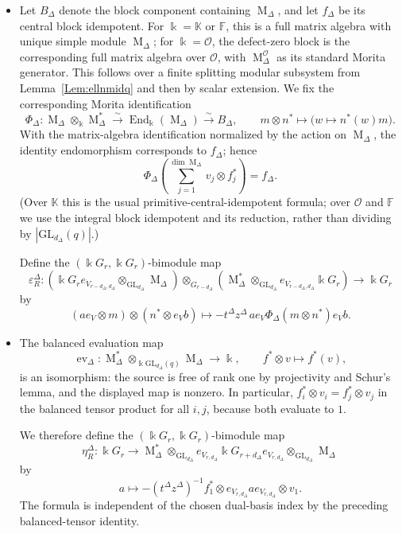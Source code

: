\documentclass[12pt]{amsart}
\numberwithin{itemcounter}{subsection}
\theoremstyle{plain}
\theoremstyle{definition}
\theoremstyle{remark}
\numberwithin{equation}{section}
\def\bbF{\mathbb{F}}
\def\bbK{\mathbb{K}}
\def\k{\Bbbk}
\def\calO{\mathcal{O}}
\def\GL{\mathrm{GL}}
\def\M{{\operatorname{M}\nolimits}}
\def\End{\operatorname{End}\nolimits}
\def\End{{\operatorname{End}}}
\begin{document}
\begin{itemize}
\item[$(c)$]
Let $B_\Delta$ denote the block component containing $\M_\Delta$, and let
$f_\Delta$ be its central block idempotent.  For $\k=\mathbb K$ or
$\mathbb F$, this is a full matrix algebra with unique simple module
$\M_\Delta$; for $\k=\mathcal O$, the defect-zero block is the corresponding
full matrix algebra over $\mathcal O$, with $\M_\Delta^{\mathcal O}$ as its
standard Morita generator.  This follows over a finite splitting modular
subsystem from Lemma~\ref{Lem:ellnmidq} and then by scalar extension.  We fix the corresponding Morita identification
\[
\Phi_\Delta:\M_\Delta\otimes_\k\M_\Delta^*
   \xrightarrow{\sim}\End_\k(\M_\Delta)
   \xrightarrow{\sim}B_\Delta,
\qquad
m\otimes n^*\longmapsto\bigl(w\mapsto n^*(w)m\bigr).
\]
With the matrix-algebra identification normalized by the action on
$\M_\Delta$, the identity endomorphism corresponds to $f_\Delta$; hence
\[
\Phi_\Delta\left(\sum_{j=1}^{\dim \M_\Delta}v_j\otimes f_j^*\right)=f_\Delta.
\]
(Over $\bbK$ this is the usual primitive-central-idempotent formula; over
$\calO$ and $\bbF$ we use the integral block idempotent and its reduction,
rather than dividing by $|\GL_{d_\Delta}(q)|$.)

Define the $(\k G_r,\k G_r)$-bimodule map
\[
\varepsilon^\Delta_R:
(\k G_r e_{V_{r-d_\Delta,d_\Delta}}\otimes_{\GL_{d_\Delta}}\M_\Delta)
\otimes_{G_{r-d_\Delta}}
(\M_\Delta^*\otimes_{\GL_{d_\Delta}}
 e_{V_{r-d_\Delta,d_\Delta}}\k G_r)
\longrightarrow \k G_r
\]
by
\[
(ae_V\otimes m)\otimes(n^*\otimes e_Vb)
\longmapsto
 -t^\Delta z^\Delta\,ae_V\Phi_\Delta(m\otimes n^*)e_Vb.
\]

\item[$(d)$]
The balanced evaluation map
\[
\operatorname{ev}_\Delta:
\M_\Delta^*\otimes_{\k\GL_{d_\Delta}(q)}\M_\Delta\longrightarrow\k,
\qquad f^*\otimes v\longmapsto f^*(v),
\]
is an isomorphism: the source is free of rank one by projectivity and
Schur's lemma, and the displayed map is nonzero.  In particular,
$f_i^*\otimes v_i=f_j^*\otimes v_j$ in the balanced tensor product for all
$i,j$, because both evaluate to $1$.

We therefore define the $(\k G_r,\k G_r)$-bimodule map
\[
\eta^\Delta_R:\k G_r\longrightarrow
\M_\Delta^*\otimes_{\GL_{d_\Delta}}
 e_{V_{r,d_\Delta}}\k G_{r+d_\Delta}e_{V_{r,d_\Delta}}
 \otimes_{\GL_{d_\Delta}}\M_\Delta
\]
by
\[
a\longmapsto-(t^\Delta z^\Delta)^{-1}
 f_1^*\otimes e_{V_{r,d_\Delta}}a e_{V_{r,d_\Delta}}\otimes v_1.
\]
The formula is independent of the chosen dual-basis index by the preceding
balanced-tensor identity.
\end{itemize}
\end{document}
